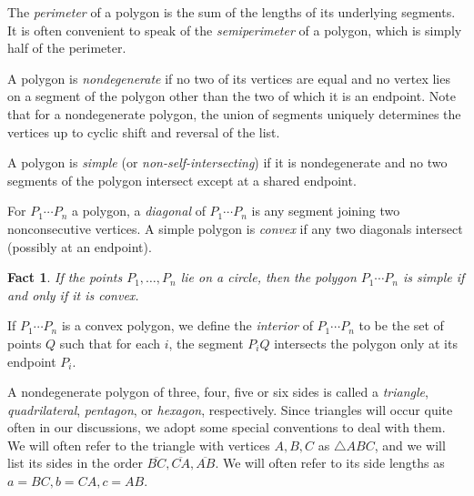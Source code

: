 \documentclass[12pt]{book}
\newcounter{exc}
\numberwithin{exc}{section}
\numberwithin{figure}{section}
\newtheorem{fact}[theorem]{Fact}
\numberwithin{equation}{theorem}
\def\seg#1{\overline{#1}}
\begin{document}
The \emph{perimeter} of a polygon
 is the sum of the lengths
of its underlying segments. It is often convenient to speak of the
\emph{semiperimeter} of a polygon,
 which is simply half
of the perimeter.

A polygon is \emph{nondegenerate}
if no two of its vertices are equal and no vertex lies on a segment 
of the polygon other than the two of which it is an endpoint.
Note that for a nondegenerate polygon, the union of segments
uniquely determines the vertices up to cyclic shift and reversal of
the list.

A polygon 
is \emph{simple} (or \emph{non-self-intersecting})
 
if it is nondegenerate and no two segments of the polygon intersect
except at a shared endpoint.

For $P_1\cdots P_n$ a polygon, a \emph{diagonal} of $P_1\cdots P_n$
is any segment joining two nonconsecutive vertices.
A simple polygon is \emph{convex} if any two diagonals intersect (possibly
at an endpoint).
\begin{fact}
If the points $P_1, \dots, P_n$ lie on a circle, then the polygon
$P_1\cdots P_n$ is simple if and only if it is convex.
\end{fact}

If $P_1 \cdots P_n$ is a convex polygon, we define the
\emph{interior} 
of $P_1\cdots P_n$ to be the set of points $Q$ such that
for each $i$, the segment $P_iQ$ intersects the polygon only at its
endpoint $P_i$. 

A nondegenerate polygon of three, four, five or six sides
is called a \emph{triangle}, 
\emph{quadrilateral}, 
\emph{pentagon}, 
or \emph{hexagon},  respectively.
Since triangles will occur quite often in our discussions, we adopt
some special conventions to deal with them. We will often refer to the triangle
with vertices $A,B,C$ as $\triangle ABC$, and we will list its sides
in the order $\seg{BC}, \seg{CA}, \seg{AB}$. We will often refer to its
side lengths as $a = BC, b = CA, c = AB$.
\end{document}
